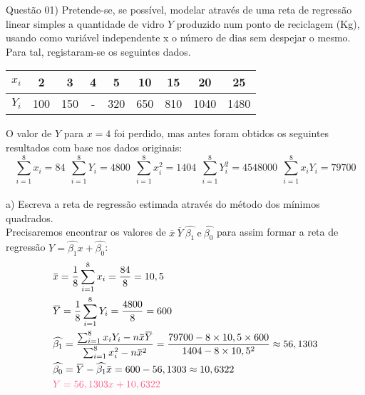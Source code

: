 
\noindent \textcolor{COLOR1}{Questão 01)}  Pretende-se, se possível, modelar através de uma reta de regressão linear simples a quantidade de vidro $Y$ produzido num ponto de reciclagem (Kg), usando como variável independente x o número de dias sem despejar o mesmo. Para tal, registaram-se os seguintes dados.
\\

\begin{table}[ht]
    \centering
    \begin{tabular}{c|c|c|c|c|c|c|c|c}
        \rowcolor{pagecolor!50!COLOR1}
        \hline
        $x_i$ & 2   & 3   & 4 & 5   & 10  & 15  & 20   & 25   \\ \hline\hline
        $Y_i$ & 100 & 150 & - & 320 & 650 & 810 & 1040 & 1480 \\\hline
    \end{tabular}
\end{table}


O valor de $Y$ para $x = 4$ foi perdido, mas antes foram obtidos os seguintes resultados com base nos dados originais:
\\

\[
    \sum_{i=1}^{8}x_i=84\ \ \sum_{i=1}^{8}Y_i=4800\ \ \sum_{i=1}^{8}x_i^2=1404\ \ \sum_{i=1}^{8}Y_i^2=4548000\ \ \sum_{i=1}^{8}x_iY_i=79700
\]
\\
a) Escreva a reta de regressão estimada através do método dos mínimos quadrados.\\

Precisaremos encontrar os valores de $\overbar{x}\ \overbar{Y}\ \widehat{\beta_1} \ \text{e}\ \widehat{\beta_0}$ para assim formar a reta de regressão $Y=\widehat{\beta_1}x + \widehat{\beta_0}$:
\\

\[
    \begin{split}
        & \overbar{x} = \frac{1}{8} \sum_{i=1}^{8}x_i = \frac{84}{8} = 10,5     \\
        & \overbar{Y} = \frac{1}{8} \sum_{i=1}^{8}Y_i = \frac{4800}{8} = 600\\
        & \widehat{\beta_1} = \frac{\sum_{i=1}^{8}x_iY_i - n\overbar{x}\overbar{Y}}{\sum_{i=1}^{8}x^2_i - n\overbar{x}^2} = \frac{79700 - 8\times10,5\times600}{1404 - 8\times10,5^2} \approx 56,1303\\
        & \widehat{\beta_0} = \overbar{Y} - \widehat{\beta_1} \overbar{x} = 600 - 56,1303 \approx 10,6322\\
        & \textcolor{COLOR2}{Y = 56,1303x + 10,6322}
    \end{split}
\]
\\


